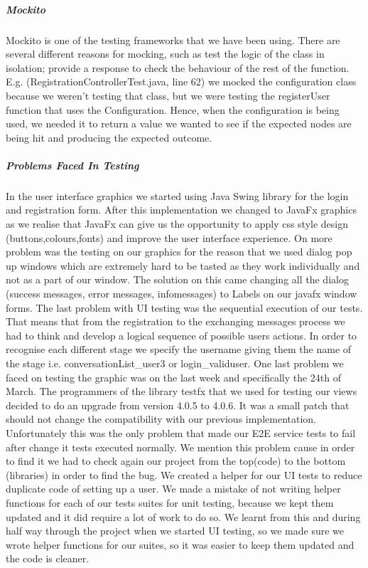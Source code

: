 \documentclass[11pt,a4paper]{report}
\begin{document}
\subparagraph{Mockito}
Mockito is one of the testing frameworks that we have been using. There are several different reasons for mocking, such as test the logic of the class in isolation; provide a response to check the behaviour of the rest of the function. E.g. (RegistrationControllerTest.java, line 62) we mocked the configuration class because we weren’t testing that class, but we were testing the registerUser function that uses the Configuration. Hence, when the configuration is being used, we needed it to return a value we wanted to see if the expected nodes are being hit and producing the expected outcome. 

\subparagraph{Problems Faced In Testing}
 In the user interface graphics we started using Java Swing library for the login and registration form. After this implementation we changed to JavaFx graphics as we realise that JavaFx can give us the opportunity to apply css style design (buttons,colours,fonts) and improve the user interface experience. On more problem was the testing on our graphics for the reason that we used dialog pop up windows which are extremely hard to be tasted as they work individually and not as a part of our window. The solution on this came changing all the dialog (success messages, error messages, infomessages) to Labels on our javafx window forms. The last problem with UI testing was the sequential execution of our tests. That means that from the registration to the exchanging messages process we had to think and develop a logical sequence of possible users actions. In order to recognise each different stage we specify the username giving them the name of the stage i.e. conversationList\_user3 or login\_validuser. One last problem we faced on testing the graphic was on the last week and specifically the 24th of March. The programmers of the library testfx that we used for testing our views decided to do an upgrade from version 4.0.5 to 4.0.6. It was a small patch that should not change the compatibility with our previous implementation. Unfortunately this was the only problem that made our E2E service tests to fail after change it tests executed normally. We mention this problem cause in order to find it we had to check again our project from the top(code) to the bottom (libraries) in order to find the bug. We created a helper for our UI tests to reduce duplicate code of setting up a user. We made a mistake of not writing helper functions for each of our tests suites for unit testing, because we kept them updated and it did require a lot of work to do so. We learnt from this and during half way through the project when we started UI testing, so we made sure we wrote helper functions for our suites, so it was easier to keep them updated and the code is cleaner. 
\end{document}
